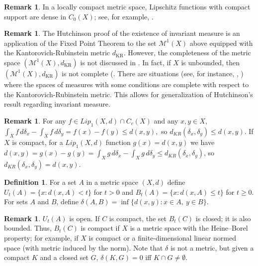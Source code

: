 \documentclass[sn-mathphys-num]{sn-jnl}%
\theoremstyle{thmstyleone}%
\theoremstyle{definition}
\newtheorem{definition}[theorem]{Definition}
\newtheorem{remark}[theorem]{Remark}
\begin{document}
\begin{remark} \label{LipDense}
In a locally compact metric space,  Lipschitz functions with compact support are dense in $C_0(X)$; see, for example, \cite[Th. 2]{Andreou}.
\end{remark}   

\begin{remark}
The Hutchinson proof of the existence of invariant measure is an application of the Fixed Point Theorem to the set  $\mathscr{M}^1(X)$ above 
equipped with the Kantorovich-Rubinstein metric $d_{\text{KR}}$.  
However, the completeness of the metric space $(\mathscr{M}^1(X), d_{\text{KR}})$ is not discussed in \cite{Hutchinson}. 
In fact, if $X$ is unbounded, then $(\mathscr{M}^1(X), d_{\text{KR}})$  is not complete (\cite[As. 1]{Kravchenko}. There are situations
(see, for instance, \cite{Akerlund-Bistrom}, \cite{Kravchenko}) 
where the spaces of measures with some conditions are complete with respect to the Kantorovich-Rubinstein metric. 
This allows for generalization of Hutchinson's 
result regarding invariant measure. 
\end{remark} 

\begin{remark} \label{RmKRd}
For any $  f  \in Lip_1(X,d) \cap C_c(X)$ and any $x, y \in X$, 
$ \int_X f \, d \delta_x - \int_X f \, d \delta_y = f(x) - f(y) \le d(x, y),$
so $d_{KR}(\delta_x, \delta_y) \le d(x,y)$.  
If $X$ is compact, for a $Lip_1(X, d)$ function $g(x) = d(x,y)$ we have  
$d(x,y) = g(x) - g(y) = \int_X g \, d\delta_x - \int_X g \, d\delta_y \le d_{KR}(\delta_x, \delta_y)$, so $d_{KR}(\delta_x, \delta_y) = d(x,y)$.
\end{remark}  

\begin{definition} 
For a set $A$ in a metric space $(X,d)$ define $U_t(A) = \{ x:  d(x, A) < t \}$ for $t >0$ and  $B_t(A) = \{ x:  d(x, A) \le t \}$ for $ t \ge 0$.
For sets $A$ and $B$, define $ \delta(A,B) = \inf \{d(x,y): x \in A, \ y \in B\}$.
\end{definition}

\begin{remark}
$U_t(A)$ is open. 
If $C$ is compact, the set $B_t(C)$ is closed; it is also bounded. 
Thus,  $B_t(C)$  is compact if $X$ is a metric space with the Heine--Borel property; for example,  if $X$ is compact or 
a finite-dimensional linear normed space (with metric induced by the norm).
Note that $\delta $ is not  a metric, but given a compact $K$ and a closed set $G$,  $\delta(K, G) = 0$ iff $ K \cap G \neq \emptyset$. 
\end{remark}
\end{document}

